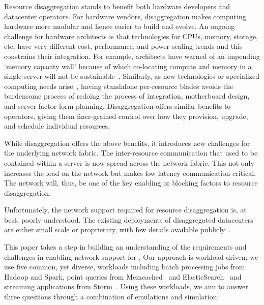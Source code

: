 Resource disaggregation stands to benefit both hardware developers and datacenter operators. %
For hardware vendors, disaggregation makes computing hardware more modular and hence 
easier to build and evolve. 
An ongoing challenge for hardware architects is that technologies for CPUs, memory, storage, etc. have very different cost, performance, and power scaling trends and this constrains their integration. For example, architects have warned of an impending `memory capacity wall' because of which co-locating compute and memory in a single server will not be sustainable~\cite{ddcHwDesign1}. 
Similarly, as new technologies or specialized computing needs arise~\cite{memristors,nvram,reg-ex-hardware,gpus}, having standalone per-resource blades avoids the burdensome process of redoing the process of integration, motherboard design, and server factor form planning. Disaggregation offers similar benefits to operators, giving them finer-grained control over how they  provision, upgrade, and schedule individual resources.

While disaggregation offers the above benefits, it introduces new challenges for the underlying network fabric. The inter-resource communication that used to be contained within a server is now spread across the network fabric. This not only increases the load on the network but makes low latency communication critical. The network will, thus, be one of the key enabling or blocking factors to resource disaggregation. 

Unfortunately, the network support required for resource disaggregation is, at best, poorly understood. The existing deployments of disaggregated datacenters are either small scale or proprietary, with few details available publicly~\cite{rsa, hptm, fdr, seamicro}.

This paper takes a step in building an understanding of the requirements and challenges in enabling network support for \dis. Our approach is workload-driven; we use five common, yet diverse, workloads including batch processing jobs from Hadoop and Spark, point queries from Memcached~\cite{memcached} and ElasticSearch~\cite{elastic} and streaming applications from Storm~\cite{storm}. Using these workloads, we aim to answer three questions through a combination of emulations and simulation: 

